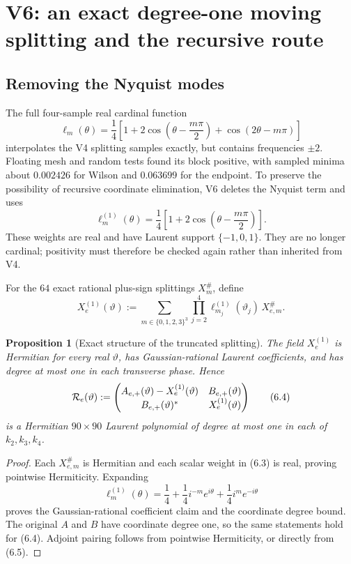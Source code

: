 \documentclass[11pt,oneside]{article}
\newtheorem{proposition}[theorem]{Proposition}
\theoremstyle{definition}
\theoremstyle{remark}
\begin{document}
\section{V6: an exact degree-one moving splitting and the recursive route}
\label{sec:newv6-degree-one}

\subsection{Removing the Nyquist modes}

The full four-sample real cardinal function
\[
 \ell_m(\theta)=\frac14\left[
 1+2\cos\left(\theta-\frac{m\pi}{2}\right)
 +\cos\left(2\theta-m\pi\right)\right]                    \tag{6.1}
\]
interpolates the V4 splitting samples exactly, but contains
frequencies \(\pm2\).  Floating mesh and random tests found its block
positive, with sampled minima about \(0.002426\) for Wilson and
\(0.063699\) for the endpoint.  To preserve the possibility of
recursive coordinate elimination, V6 deletes the Nyquist term and
uses
\[
 \ell_m^{(1)}(\theta)
 =\frac14\left[
 1+2\cos\left(\theta-\frac{m\pi}{2}\right)\right].         \tag{6.2}
\]
These weights are real and have Laurent support \(\{-1,0,1\}\).
They are no longer cardinal; positivity must therefore be checked
again rather than inherited from V4.

For the \(64\) exact rational plus-sign splittings
\(X_m^\#\), define
\[
 X_e^{(1)}(\vartheta)
 :=
 \sum_{m\in\{0,1,2,3\}^3}
 \prod_{j=2}^4\ell_{m_j}^{(1)}(\vartheta_j)\,X_{e,m}^\#.
                                                               \tag{6.3}
\]

\begin{proposition}[Exact structure of the truncated splitting]
\label{prop:newv6-structure}
The field \(X_e^{(1)}\) is Hermitian for every real
\(\vartheta\), has Gaussian-rational Laurent coefficients, and has
degree at most one in each transverse phase.  Hence
\[
 {\cal R}_e(\vartheta):=
 \begin{pmatrix}
 A_{e,+}(\vartheta)-X_e^{(1)}(\vartheta)&
 B_{e,+}(\vartheta)\\
 B_{e,+}(\vartheta)^*&X_e^{(1)}(\vartheta)
 \end{pmatrix}                                            \tag{6.4}
\]
is a Hermitian \(90\times90\) Laurent polynomial of degree at most
one in each of \(k_2,k_3,k_4\).
\end{proposition}

\begin{proof}
Each \(X_{e,m}^\#\) is Hermitian and each scalar weight in (6.3) is
real, proving pointwise Hermiticity.  Expanding
\[
 \ell_m^{(1)}(\theta)
 =\frac14+\frac14i^{-m}e^{i\theta}
  +\frac14i^m e^{-i\theta}                                \tag{6.5}
\]
proves the Gaussian-rational coefficient claim and the coordinate
degree bound.  The original \(A\) and \(B\) have coordinate degree
one, so the same statements hold for (6.4).  Adjoint pairing follows
from pointwise Hermiticity, or directly from (6.5).
\end{proof}
\end{document}
